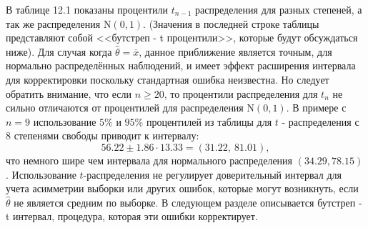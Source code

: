 В таблице 12.1 показаны процентили $t_{n-1}$ распределения для разных степеней, а так же распределения $\mathrm{N} (0, 1)$. (Значения в последней строке таблицы представляют собой <<бутстреп - t процентили>>, которые будут обсуждаться ниже). Для случая когда $ \widehat{\theta} = \overline{x}$, данное приближение является точным, для нормально распределённых наблюдений, и имеет эффект расширения интервала для корректировки поскольку стандартная ошибка неизвестна. Но следует обратить внимание, что если $n \ge 20$, то процентили распределения для $t_{n}$ не сильно отличаются от процентилей для распределения $\mathrm{N}(0, 1)$. В примере с $n = 9$ использование $5\%$ и $95\%$ процентилей из таблицы для $t$ - распределения с 8 степенями свободы приводит к интервалу:
$$56.22 \pm 1.86\cdot 13.33 = (31.22,\ 81.01),$$
что немного шире чем интервала для нормального распределения $(34.29, 78.15)$. Использование $t$-распределения не регулирует доверительный интервал для учета асимметрии выборки или других ошибок, которые могут возникнуть, если $\widehat{\theta}$ не является средним по выборке. В следующем разделе описывается бутстреп - t интервал, процедура, которая эти ошибки корректирует.
